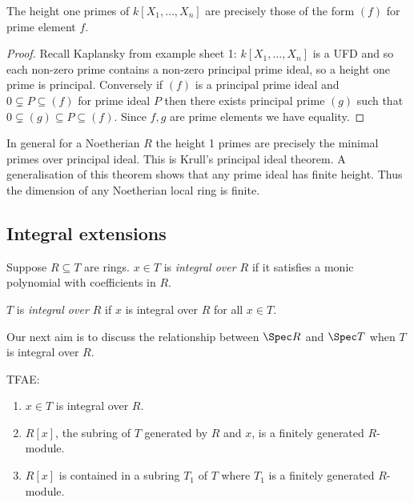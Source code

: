 \documentclass[a4paper]{article}
\begin{document}
\begin{lemma}
  The height one primes of \(k[X_1, \dots, X_n]\) are precisely those of the form \((f)\) for prime element \(f\).
\end{lemma}

\begin{proof}
  Recall Kaplansky from example sheet 1: \(k[X_1, \dots, X_n]\) is a UFD and so each non-zero prime contains a non-zero principal prime ideal, so a height one prime is principal. Conversely if \((f)\) is a principal prime ideal and \(0 \subsetneq P \subseteq (f)\) for prime ideal \(P\) then there exists principal prime \((g)\) such that \(0 \subsetneq (g) \subseteq P \subseteq (f)\). Since \(f, g\) are prime elements we have equality.
\end{proof}

\begin{remark}
  In general for a Noetherian \(R\) the height 1 primes are precisely the minimal primes over principal ideal. This is Krull's principal ideal theorem. A generalisation of this theorem shows that any prime ideal has finite height. Thus the dimension of any Noetherian local ring is finite.
\end{remark}

\subsection{Integral extensions}

\begin{definition}
  Suppose \(R \subseteq T\) are rings. \(x \in T\) is \emph{integral over \(R\)} if it satisfies a monic polynomial with coefficients in \(R\).

  \(T\) is \emph{integral over \(R\)} if \(x\) is integral over \(R\) for all \(x \in T\).
\end{definition}

Our next aim is to discuss the relationship between \(\Spec R\) and \(\Spec T\) when \(T\) is integral over \(R\).

\begin{lemma}
  TFAE:
  \begin{enumerate}
  \item \(x \in T\) is integral over \(R\).
  \item \(R[x]\), the subring of \(T\) generated by \(R\) and \(x\), is a finitely generated \(R\)-module.
  \item \(R[x]\) is contained in a subring \(T_1\) of \(T\) where \(T_1\) is a finitely generated \(R\)-module.
  \end{enumerate}
\end{lemma}
\end{document}
